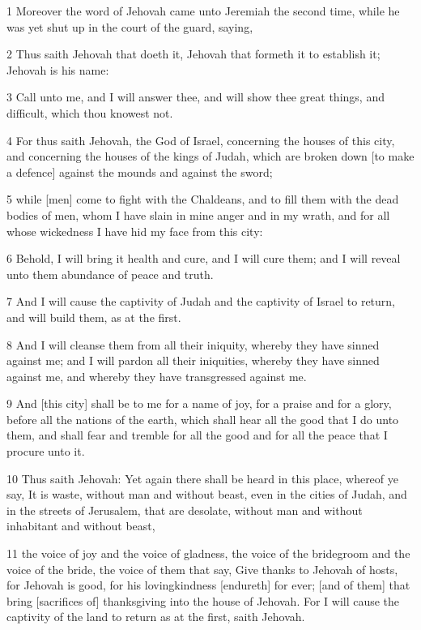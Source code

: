 \par 1 Moreover the word of Jehovah came unto Jeremiah the second time, while he was yet shut up in the court of the guard, saying,
\par 2 Thus saith Jehovah that doeth it, Jehovah that formeth it to establish it; Jehovah is his name:
\par 3 Call unto me, and I will answer thee, and will show thee great things, and difficult, which thou knowest not.
\par 4 For thus saith Jehovah, the God of Israel, concerning the houses of this city, and concerning the houses of the kings of Judah, which are broken down [to make a defence] against the mounds and against the sword;
\par 5 while [men] come to fight with the Chaldeans, and to fill them with the dead bodies of men, whom I have slain in mine anger and in my wrath, and for all whose wickedness I have hid my face from this city:
\par 6 Behold, I will bring it health and cure, and I will cure them; and I will reveal unto them abundance of peace and truth.
\par 7 And I will cause the captivity of Judah and the captivity of Israel to return, and will build them, as at the first.
\par 8 And I will cleanse them from all their iniquity, whereby they have sinned against me; and I will pardon all their iniquities, whereby they have sinned against me, and whereby they have transgressed against me.
\par 9 And [this city] shall be to me for a name of joy, for a praise and for a glory, before all the nations of the earth, which shall hear all the good that I do unto them, and shall fear and tremble for all the good and for all the peace that I procure unto it.
\par 10 Thus saith Jehovah: Yet again there shall be heard in this place, whereof ye say, It is waste, without man and without beast, even in the cities of Judah, and in the streets of Jerusalem, that are desolate, without man and without inhabitant and without beast,
\par 11 the voice of joy and the voice of gladness, the voice of the bridegroom and the voice of the bride, the voice of them that say, Give thanks to Jehovah of hosts, for Jehovah is good, for his lovingkindness [endureth] for ever; [and of them] that bring [sacrifices of] thanksgiving into the house of Jehovah. For I will cause the captivity of the land to return as at the first, saith Jehovah.
